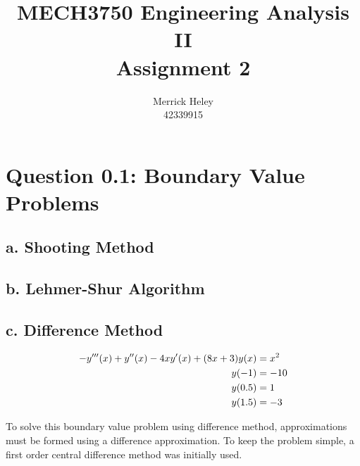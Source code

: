 \documentclass[a4paper,11pt,titlepage]{article}
\title{
MECH3750 Engineering Analysis II \\ 
Assignment 2
}
\author{
Merrick Heley\\
42339915
}
\begin{document}
\maketitle

\section*{Question 0.1: Boundary Value Problems}
\subsection*{a. Shooting Method}

\subsection*{b. Lehmer-Shur Algorithm}

\subsection*{c. Difference Method}

\begin{align}
-y'''(x) + y''(x) - 4xy'(x) + (8x + 3)y(x) &= x^2 \label{eq:q1bvp}\\
y(-1) & = -10 \notag\\
y(0.5) & = 1 \notag\\
y(1.5) & = -3 \notag
\end{align}

To solve this boundary value problem using difference method, approximations 
must be formed using a difference approximation. To keep the problem simple, a 
first order central difference method was initially used.
\end{document}
